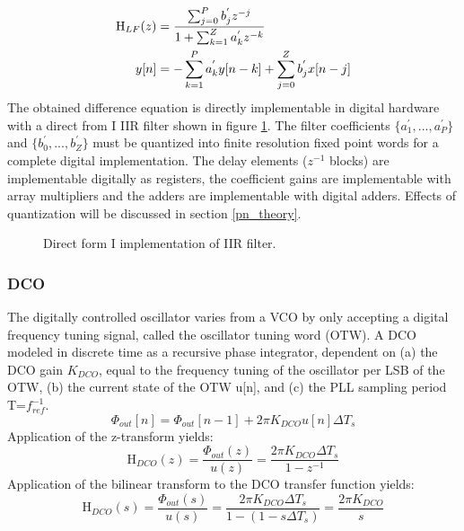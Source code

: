 	\begin{align}
		\textnormal{H}_{LF}(z) &= \frac{\sum_{j=0}^P b_j^{'}z^{-j}}{1+\sum_{k=1}^Z a_k^{'}z^{-k}}\label{eq:canonical_z_tf} \\
		y[n]&= -\sum_{k=1}^P a_k^{'}y[n-k] + \sum_{j=0}^Z b_j^{'}x[n-j] \label{eq:cananical_diff_eq}
	\end{align}
	The obtained difference equation is directly implementable in digital hardware with a direct from I IIR filter \cite{proakis_1993} shown in figure \ref{fig:filt_implementation}. The filter coefficients $\{a_1^{'}, ..., a_P^{'}\}$ and $\{b_0^{'}, ..., b_Z^{'}\}$ must be quantized into finite resolution fixed point words for a complete digital implementation. The delay elements ($z^{-1}$ blocks) are implementable digitally as registers, the coefficient gains are implementable with array multipliers and the adders are implementable with digital adders. Effects of quantization will be discussed in section \ref{pn_theory}.
	\begin{figure}[htb!]
		\center
		\caption{Direct form I implementation of IIR filter.}
		\label{fig:filt_implementation}
	\end{figure}


\subsubsection{DCO}
	The digitally controlled oscillator varies from a VCO by only accepting a digital frequency tuning signal, called the oscillator tuning word (OTW). A DCO modeled in discrete time as a recursive phase integrator, dependent on (a) the DCO gain $K_{DCO}$, equal to the frequency tuning of the oscillator per LSB of the OTW, (b) the current state of the OTW u[n], and (c) the PLL sampling period T=$f_{ref}^{-1}$.
	\begin{equation}
		\Phi_{out}[n] = \Phi_{out}[n-1] + 2\pi K_{DCO}u[n]\Delta T_s
	\end{equation}
	Application of the z-transform yields:
	\begin{equation}
		\mathrm{H}_{DCO}(z) = \frac{\Phi_{out}(z)}{u(z)} = \frac{2\pi K_{DCO}\Delta T_s}{1-z^{-1}}
	\end{equation}
	Application of the bilinear transform to the DCO transfer function yields:
	\begin{equation}
		\mathrm{H}_{DCO}(s) = \frac{\Phi_{out}(s)}{u(s)} = \frac{2\pi K_{DCO}\Delta T_s}{1-(1-s\Delta T_s)} = \frac{2\pi K_{DCO}}{s} 
	\end{equation}


